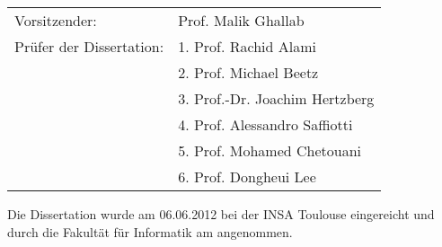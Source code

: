   \vspace{1cm}

  \begin{tabular}{ll}
    Vorsitzender:              & Prof. Malik Ghallab \\[10mm]

    Pr\"ufer der Dissertation: & 1. Prof. Rachid Alami\\ %
                               & 2. Prof. Michael Beetz\\ %
                               & 3. Prof.-Dr. Joachim Hertzberg\\ %
                               & 4. Prof. Alessandro Saffiotti\\ %
                               & 5. Prof. Mohamed Chetouani\\ %
                               & 6. Prof. Dongheui Lee\\ %
  \end{tabular}

  \vspace{1.5cm}

\normalsize
{\flushleft

Die Dissertation wurde am 06.06.2012 bei der INSA Toulouse eingereicht und
durch die Fakult{\"a}t f{\"u}r Informatik am \hspace{2cm} angenommen.

}



